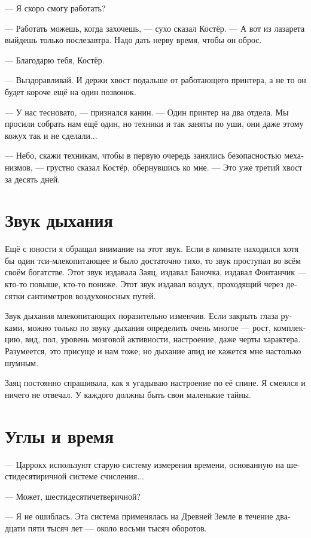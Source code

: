 \documentclass[a4paper,12pt,fleqn]{book}\usepackage{polyglossia}\setdefaultlanguage[babelshorthands=true]{russian}\setotherlanguage{english}\defaultfontfeatures{Ligatures=TeX,Mapping=tex-text}\usepackage{xcolor}\newcommand{\ml}[3]{#2}
\begin{document}
{--- Я скоро смогу работать?

--- Работать можешь, когда захочешь, --- сухо сказал Костёр.
--- А вот из лазарета выйдешь только послезавтра.
Надо дать нерву время, чтобы он оброс.

--- Благодарю тебя, Костёр.

--- Выздоравливай.
И держи хвост подальше от работающего принтера, а не то он будет короче ещё на один позвонок.

--- У нас тесновато, --- признался канин.
--- Один принтер на два отдела.
Мы просили собрать нам ещё один, но техники и так заняты по уши, они даже этому кожух так и не сделали...

--- Небо, скажи техникам, чтобы в первую очередь занялись безопасностью механизмов, --- грустно сказал Костёр, обернувшись ко мне.
--- Это уже третий хвост за десять дней.

\section{Звук дыхания}

Ещё с юности я обращал внимание на этот звук.
Если в комнате находился хотя бы один тси-млекопитающее и было достаточно тихо, то звук проступал во всём своём богатстве.
Этот звук издавала Заяц, издавал Баночка, издавал Фонтанчик --- кто-то повыше, кто-то пониже.
Этот звук издавал воздух, проходящий через десятки сантиметров воздухоносных путей.

Звук дыхания млекопитающих поразительно изменчив.
Если закрыть глаза руками, можно только по звуку дыхания определить очень многое --- рост, комплекцию, вид, пол, уровень мозговой активности, настроение, даже черты характера.
Разумеется, это присуще и нам тоже;
но дыхание апид не кажется мне настолько шумным.

Заяц постоянно спрашивала, как я угадываю настроение по её спине.
Я смеялся и ничего не отвечал.
У каждого должны быть свои маленькие тайны.

\section{Углы и время}

--- Царрокх используют старую систему измерения времени, основанную на шестидесятиричной системе счисления...

--- Может, шестидесятичетверичной?

--- Я не ошиблась.
Эта система применялась на Древней Земле в течение двадцати пяти тысяч лет --- около восьми тысяч оборотов.

}
\end{document}
